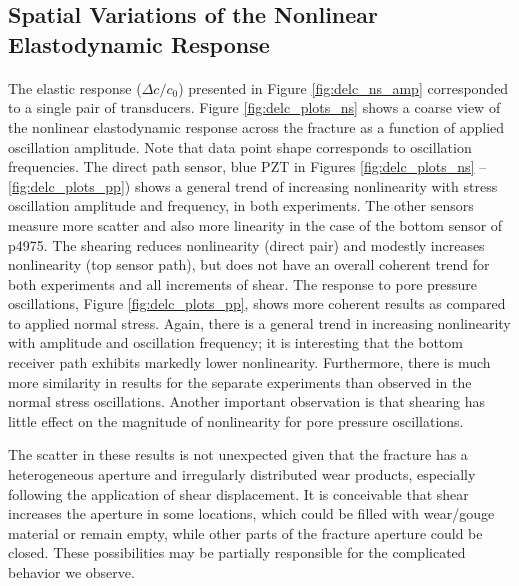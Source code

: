 \documentclass[letterpaper,10pt]{article}
\begin{document}
\clearpage


\subsection{Spatial Variations of the Nonlinear Elastodynamic Response}
\paragraph{}
The elastic response ($ \Delta c/c_0 $) presented in Figure \ref{fig:delc_ns_amp} corresponded to a single pair of transducers. 
Figure \ref{fig:delc_plots_ns} shows a coarse view of the nonlinear elastodynamic response across the fracture as a function of applied oscillation amplitude. Note that data point shape corresponds to oscillation frequencies. The direct path sensor, blue PZT in Figures \ref{fig:delc_plots_ns} -- \ref{fig:delc_plots_pp}) shows a general trend of increasing nonlinearity with stress oscillation amplitude and frequency, in both experiments. The other sensors measure more scatter and also more linearity in the case of the bottom sensor of p4975. The shearing reduces nonlinearity (direct pair) and modestly increases nonlinearity (top sensor path), but does not have an overall coherent trend for both experiments and all increments of shear.
The response to pore pressure oscillations, Figure \ref{fig:delc_plots_pp}, shows more coherent results as compared to applied normal stress. Again, there is a general trend in increasing nonlinearity with amplitude and oscillation frequency; it is interesting that the bottom receiver path exhibits markedly lower nonlinearity. Furthermore, there is much more similarity in results for the separate experiments than observed in the normal stress oscillations. Another important observation is that shearing has little effect on the magnitude of nonlinearity for pore pressure oscillations.

The scatter in these results is not unexpected given that the fracture has a heterogeneous aperture and irregularly distributed wear products, especially following the application of shear displacement. It is conceivable that shear increases the aperture in some locations, which could be filled with wear/gouge material or remain empty, while other parts of the fracture aperture could be closed. These possibilities may be partially responsible for the complicated behavior we observe.
\end{document}
